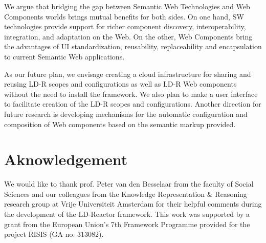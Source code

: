 \documentclass{llncs}
\begin{document}
We argue that bridging the gap between Semantic Web Technologies and Web Components worlds brings mutual benefits for both sides.
On one hand, SW technologies provide support for richer component discovery, interoperability, integration, and adaptation on the Web.
On the other, Web Components bring the advantages of UI standardization, reusability, replaceability and encapsulation to current Semantic Web applications.

As our future plan, we envisage creating a cloud infrastructure for sharing and reusing LD-R scopes and configurations as well as LD-R Web components without the need to install the framework.
We also plan to make a user interface to facilitate creation of the LD-R scopes and configurations.
Another direction for future research is developing mechanisms for the automatic configuration and composition of Web components based on the semantic markup provided.

\section{Aknowledgement}
\small
We would like to thank prof. Peter van den Besselaar from the faculty of Social Sciences and our colleagues from the Knowledge Representation \& Reasoning research group at Vrije Universiteit Amsterdam for their helpful comments during the development of the LD-Reactor framework. This work was supported by a grant from the European Union's 7th Framework Programme provided for the project RISIS (GA no. 313082).



\scriptsize

\end{document}
